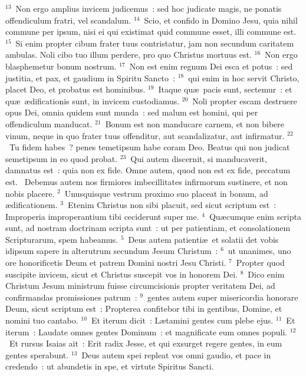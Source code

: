 ${}^{13}$~Non ergo amplius invicem judicemus~: sed hoc judicate magis, ne ponatis offendiculum fratri, vel scandalum.
${}^{14}$~Scio, et confido in Domino Jesu, quia nihil commune per ipsum, nisi ei qui existimat quid commune esset, illi commune est.
${}^{15}$~Si enim propter cibum frater tuus contristatur, jam non secundum caritatem ambulas. Noli cibo tuo illum perdere, pro quo Christus mortuus est.
${}^{16}$~Non ergo blasphemetur bonum nostrum.
${}^{17}$~Non est enim regnum Dei esca et potus~: sed justitia, et pax, et gaudium in Spiritu Sancto~:
${}^{18}$~qui enim in hoc servit Christo, placet Deo, et probatus est hominibus.
${}^{19}$~Itaque qu\ae\ pacis sunt, sectemur~: et qu\ae\ \ae dificationis sunt, in invicem custodiamus.
${}^{20}$~Noli propter escam destruere opus Dei, omnia quidem sunt munda~: sed malum est homini, qui per offendiculum manducat.
${}^{21}$~Bonum est non manducare carnem, et non bibere vinum, neque in quo frater tuus offenditur, aut scandalizatur, aut infirmatur.
${}^{22}$~Tu fidem habes~? penes temetipsum habe coram Deo. Beatus qui non judicat semetipsum in eo quod probat.
${}^{23}$~Qui autem discernit, si manducaverit, damnatus est~: quia non ex fide. Omne autem, quod non est ex fide, peccatum est.
~Debemus autem nos firmiores imbecillitates infirmorum sustinere, et non nobis placere.
${}^{2}$~Unusquisque vestrum proximo suo placeat in bonum, ad \ae dificationem.
${}^{3}$~Etenim Christus non sibi placuit, sed sicut scriptum est~: Improperia improperantium tibi ceciderunt super me.
${}^{4}$~Qu\ae cumque enim scripta sunt, ad nostram doctrinam scripta sunt~: ut per patientiam, et consolationem Scripturarum, spem habeamus.
${}^{5}$~Deus autem patienti\ae\ et solatii det vobis idipsum sapere in alterutrum secundum Jesum Christum~:
${}^{6}$~ut unanimes, uno ore honorificetis Deum et patrem Domini nostri Jesu Christi.
${}^{7}$~Propter quod suscipite invicem, sicut et Christus suscepit vos in honorem Dei.
${}^{8}$~Dico enim Christum Jesum ministrum fuisse circumcisionis propter veritatem Dei, ad confirmandas promissiones patrum~:
${}^{9}$~gentes autem super misericordia honorare Deum, sicut scriptum est~: Propterea confitebor tibi in gentibus, Domine, et nomini tuo cantabo.
${}^{10}$~Et iterum dicit~: L\ae tamini gentes cum plebe ejus.
${}^{11}$~Et iterum~: Laudate omnes gentes Dominum~: et magnificate eum omnes populi.
${}^{12}$~Et rursus Isaias ait~: Erit radix Jesse, et qui exsurget regere gentes, in eum gentes sperabunt.
${}^{13}$~Deus autem spei repleat vos omni gaudio, et pace in credendo~: ut abundetis in spe, et virtute Spiritus Sancti.


